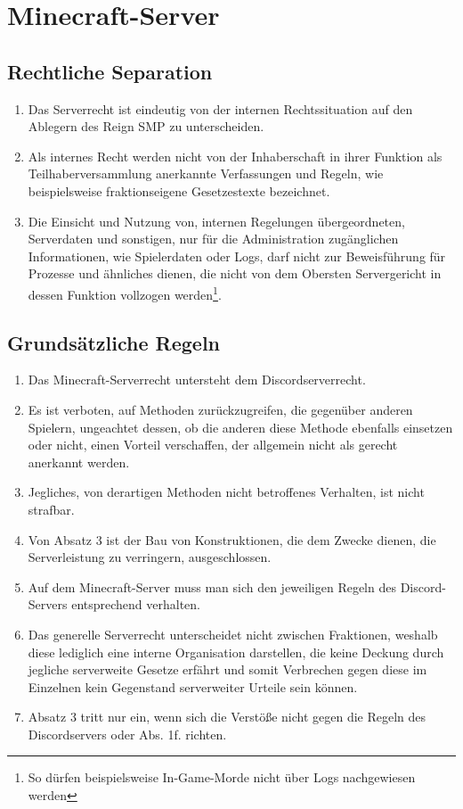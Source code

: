 \documentclass{article}
\begin{document}
\section{Minecraft-Server}

\subsection{Rechtliche Separation}
\begin{enumerate}[(1)]
	\item Das Serverrecht ist eindeutig von der internen Rechtssituation auf den Ablegern des Reign SMP zu unterscheiden.
	\item Als internes Recht werden nicht von der Inhaberschaft in ihrer Funktion als Teilhaberversammlung anerkannte Verfassungen und Regeln, wie beispielsweise fraktionseigene Gesetzestexte bezeichnet.
	\item Die Einsicht und Nutzung von, internen Regelungen übergeordneten, Serverdaten und sonstigen, nur für die Administration zugänglichen Informationen, wie Spielerdaten oder Logs, darf nicht zur Beweisführung für Prozesse und ähnliches dienen, die nicht von dem Obersten Servergericht in dessen Funktion vollzogen werden\footnote{So dürfen beispielsweise In-Game-Morde nicht über Logs nachgewiesen werden}.
\end{enumerate}

\subsection{Grundsätzliche Regeln}
\begin{enumerate}[(1)]
	\item Das Minecraft-Serverrecht untersteht dem Discordserverrecht.
	\item Es ist verboten, auf Methoden zurückzugreifen, die gegenüber anderen Spielern, ungeachtet dessen, ob die anderen diese Methode ebenfalls einsetzen oder nicht, einen Vorteil verschaffen, der allgemein nicht als gerecht anerkannt werden.
	\item Jegliches, von derartigen Methoden nicht betroffenes Verhalten, ist nicht strafbar.
	\item Von Absatz 3 ist der Bau von Konstruktionen, die dem Zwecke dienen, die Serverleistung zu verringern, ausgeschlossen.
	\item Auf dem Minecraft-Server muss man sich den jeweiligen Regeln des Discord-Servers entsprechend verhalten.
	\item Das generelle Serverrecht unterscheidet nicht zwischen Fraktionen, weshalb diese lediglich eine interne Organisation darstellen, die keine Deckung durch jegliche serverweite Gesetze erfährt und somit Verbrechen gegen diese im Einzelnen kein Gegenstand serverweiter Urteile sein können.
	\item Absatz 3 tritt nur ein, wenn sich die Verstöße nicht gegen die Regeln des Discordservers oder Abs. 1f. richten. 
\end{enumerate}
\end{document}
